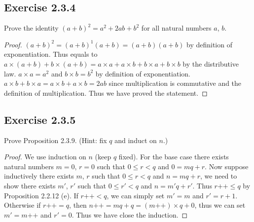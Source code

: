 \documentclass[a4paper]{article}
\begin{document}
\subsection*{Exercise 2.3.4}

Prove the identity $\left( a + b \right) ^2 = a^2 + 2ab + b^2$ for all natural
numbers $a$, $b$.

\begin{proof}

	$\left( a+b \right) ^2 = \left( a+b \right) ^1 \left( a + b \right) = \left( a + b \right) \left( a + b \right) $ by definition of exponentiation. Thus equals to  $a\times \left( a + b \right) + b\times \left( a+b \right) = a\times a + a\times b + b\times a + b\times b$ by the distributive law. $a\times a = a^2$ and $b\times b = b^2$ by definition of exponentiation. $a\times b + b\times a = a\times b + a\times b = 2ab$ since multiplication is commutative and the definition of multiplication. Thus we have proved the statement.

\end{proof}

\subsection*{Exercise 2.3.5}

Prove Proposition 2.3.9. (Hint: fix $q$ and induct on $n$.)

\begin{proof}

	We use induction on $n$ (keep $q$ fixed). For the base case there exists natural numbers $m = 0$, $r = 0$ such that $0 \le r < q$ and $0 = mq + r$. Now suppose inductively there exists $m$, $r$ such that $0 \le r < q$ and $n = mq + r$, we need to show there exists $m'$,  $r'$ such that  $0 \le r' < q$ and $n = m'q + r'$. Thus $r\text{++} \le q$ by Proposition 2.2.12 (e). If $r\text{++} < q$, we can simply set $m' = m$ and  $r' = r + 1$. Otherwise if  $r\text{++} = q$, then $n\text{++} = mq + q = \left( m\text{++} \right) \times q + 0$, thus we can set $m' = m\text{++}$ and $r' = 0$. Thus we have close the induction.

\end{proof}
\end{document}
